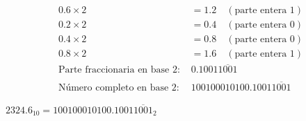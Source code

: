 \begin{frame}
\begin{enumerate}
\begin{enumerate}[a)]
\begin{align*}
			            0.6 \times 2 &= 1.2 \quad (\text{parte entera 1}) \\
			            0.2 \times 2 &= 0.4 \quad (\text{parte entera 0}) \\
			            0.4 \times 2 &= 0.8 \quad (\text{parte entera 0}) \\
			            0.8 \times 2 &= 1.6 \quad (\text{parte entera 1}) \\
			            \text{Parte fraccionaria en base 2: } & 0.1001\overline{1001} \\
			            \\
			            \text{Número completo en base 2: } & 100100010100.1001\overline{1001}
		            \end{align*}

	      \end{enumerate}
\end{enumerate}

\begin{solution}
	$2324.6_{10} = 100100010100.1001\overline{1001}_2$
\end{solution}
\end{frame}


